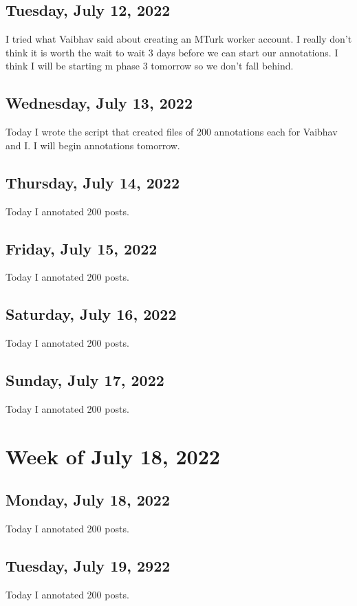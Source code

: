 \documentclass[11pt,letterpaper]{article}
\begin{document}
\subsection{Tuesday, July 12, 2022}
I tried what Vaibhav said about creating an MTurk worker account. I really don't think it is worth the wait to wait 3 days before we can start our annotations. I think I will be starting m phase 3 tomorrow so we don't fall behind.

\subsection{Wednesday, July 13, 2022}
Today I wrote the script that created files of 200 annotations each for Vaibhav and I. I will begin annotations tomorrow.

\subsection{Thursday, July 14, 2022}
Today I annotated 200 posts.

\subsection{Friday, July 15, 2022}
Today I annotated 200 posts.

\subsection{Saturday, July 16, 2022}
Today I annotated 200 posts.

\subsection{Sunday, July 17, 2022}
Today I annotated 200 posts.

\section{Week of July 18, 2022}
\subsection{Monday, July 18, 2022}
Today I annotated 200 posts.

\subsection{Tuesday, July 19, 2922}
Today I annotated 200 posts.
\end{document}
